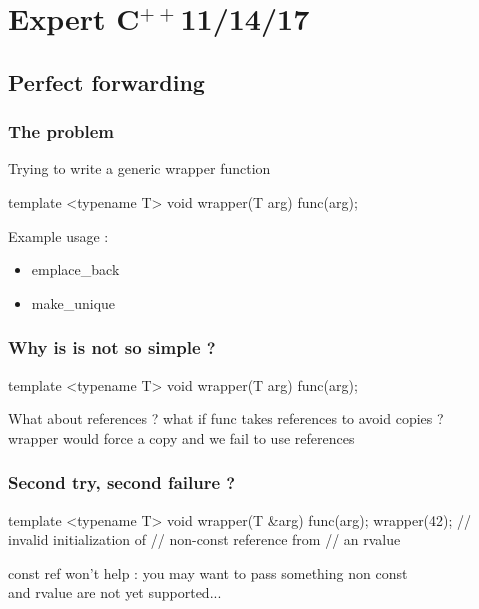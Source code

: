\section[exp]{Expert C$^{++}$11/14/17}

\subsection[forward]{Perfect forwarding}

\begin{frame}[fragile]
  \frametitle{The problem}
  Trying to write a generic wrapper function
  \begin{cppcode*}{}
    template <typename T>
    void wrapper(T arg) {
      func(arg);
    }
  \end{cppcode*}
  Example usage :
  \begin{itemize}
  \item emplace\_back
  \item make\_unique
  \end{itemize}
\end{frame}

\begin{frame}[fragile]
  \frametitle{Why is is not so simple ?}
  \begin{cppcode*}{}
    template <typename T>
    void wrapper(T arg) {
      func(arg);
    }
  \end{cppcode*}
  \begin{alertblock}{What about references ?}
    what if func takes references to avoid copies ?\\
    wrapper would force a copy and we fail to use references
  \end{alertblock}
\end{frame}

\begin{frame}[fragile]
  \frametitle{Second try, second failure ?}
  \begin{cppcode*}{}
    template <typename T>
    void wrapper(T &arg) {
      func(arg);
    }
    wrapper(42);
    // invalid initialization of
    // non-const reference from
    // an rvalue
  \end{cppcode*}
  \begin{alertblock}{}
    const ref won't help : you may want to pass something non const\\
    and rvalue are not yet supported...
  \end{alertblock}
\end{frame}


